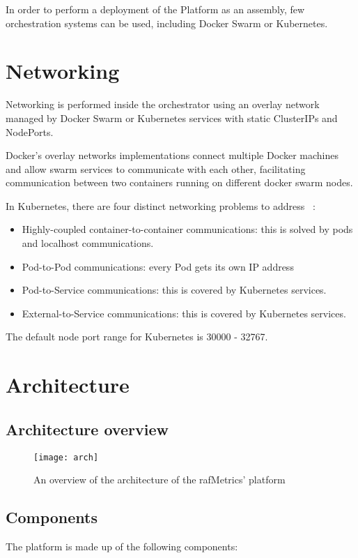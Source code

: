 In order to perform a deployment of the Platform as an assembly, few orchestration systems can be used, including Docker Swarm or Kubernetes.


\section{Networking}

Networking is performed inside the orchestrator using an overlay network managed by Docker Swarm or Kubernetes services with static ClusterIPs and NodePorts.

Docker's overlay networks implementations connect multiple Docker machines and allow swarm services to communicate with each other, facilitating communication between two containers running on
different docker swarm nodes.

In Kubernetes, there are four distinct networking problems to address ~\cite{authors2017kubernetes}:

\begin{itemize}
    \item Highly-coupled container-to-container communications: this is solved by pods and localhost communications.
    \item Pod-to-Pod communications: every Pod gets its own IP address
    \item Pod-to-Service communications: this is covered by Kubernetes services.
    \item External-to-Service communications: this is covered by Kubernetes services.
\end{itemize}

The default node port range for Kubernetes is 30000 - 32767.


\section{Architecture}

\subsection{Architecture overview}


\begin{figure}[H]
    \centering
    \texttt{[image: arch]}
    \caption{An overview of the architecture of the rafMetrics' platform}
\end{figure}

\subsection{Components}
The platform is made up of the following components:

